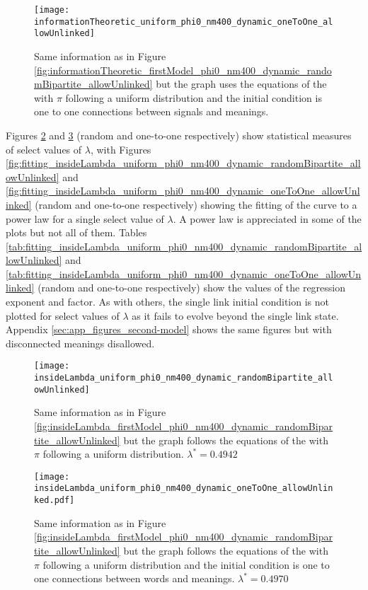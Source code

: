 \begin{figure}
  \centering
  \texttt{[image: informationTheoretic\_uniform\_phi0\_nm400\_dynamic\_oneToOne\_allowUnlinked]}
  \caption{Same information as in Figure \ref{fig:informationTheoretic_firstModel_phi0_nm400_dynamic_randomBipartite_allowUnlinked} but the graph uses the equations of the \secondmodel{} with $\pi$ following a uniform distribution and the initial condition is one to one connections between signals and meanings.}
  \label{fig:informationTheoretic_uniform_phi0_nm400_dynamic_oneToOne_allowUnlinked}
\end{figure}


Figures \ref{fig:insideLambda_uniform_phi0_nm400_dynamic_randomBipartite_allowUnlinked} and \ref{fig:insideLambda_uniform_phi0_nm400_dynamic_oneToOne_allowUnlinked} (random and one-to-one respectively) show statistical measures of select values of $\lambda$, with Figures \ref{fig:fitting_insideLambda_uniform_phi0_nm400_dynamic_randomBipartite_allowUnlinked} and \ref{fig:fitting_insideLambda_uniform_phi0_nm400_dynamic_oneToOne_allowUnlinked} (random and one-to-one respectively) showing the fitting of the curve to a power law for a single select value of $\lambda$.
A power law is appreciated in some of the plots but not all of them.
Tables \ref{tab:fitting_insideLambda_uniform_phi0_nm400_dynamic_randomBipartite_allowUnlinked} and \ref{tab:fitting_insideLambda_uniform_phi0_nm400_dynamic_oneToOne_allowUnlinked} (random and one-to-one respectively) show the values of the regression exponent and factor.
As with others, the single link initial condition is not plotted for select values of $\lambda$ as it fails to evolve beyond the single link state.
Appendix \ref{sec:app_figures_second-model} shows the same figures but with disconnected meanings disallowed.

\begin{figure}
  \centering
  \texttt{[image: insideLambda\_uniform\_phi0\_nm400\_dynamic\_randomBipartite\_allowUnlinked]}
  \caption{Same information as in Figure \ref{fig:insideLambda_firstModel_phi0_nm400_dynamic_randomBipartite_allowUnlinked} but the graph follows the equations of the \secondmodel{} with $\pi$ following a uniform distribution. $\lambda^* = 0.4942$}
  \label{fig:insideLambda_uniform_phi0_nm400_dynamic_randomBipartite_allowUnlinked}
\end{figure}

\begin{figure}
  \centering
  \texttt{[image: insideLambda\_uniform\_phi0\_nm400\_dynamic\_oneToOne\_allowUnlinked.pdf]}
  \caption{Same information as in Figure \ref{fig:insideLambda_firstModel_phi0_nm400_dynamic_randomBipartite_allowUnlinked} but the graph follows the equations of the \secondmodel{} with $\pi$ following a uniform distribution and the initial condition is one to one connections between words and meanings. $\lambda^* = 0.4970$}
  \label{fig:insideLambda_uniform_phi0_nm400_dynamic_oneToOne_allowUnlinked}
\end{figure}


